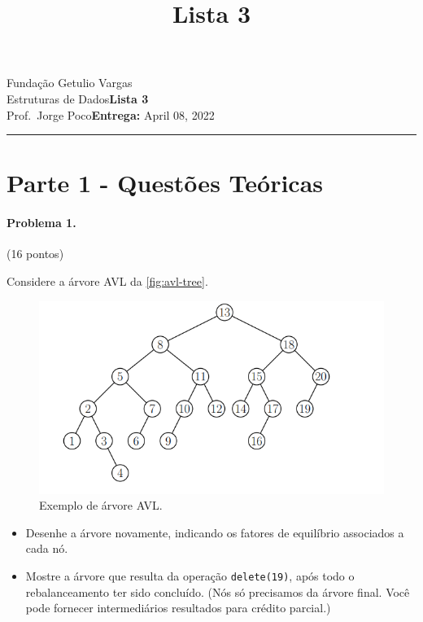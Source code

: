 \documentclass{article}
\title{Lista 3}
\date{}
\newcommand{\assignment}{Lista 3}
\newcommand{\duedate}{April 08, 2022}
\begin{document}
Fundação Getulio Vargas\hfill\\
Estruturas de Dados\hfill\textbf{\assignment}\\
Prof.\ Jorge Poco\hfill\textbf{Entrega:} \duedate\\
\smallskip\hrule\bigskip

{\let\newpage\relax\maketitle}
\maketitle

\section*{Parte 1 - Questões Teóricas}
\paragraph{Problema 1.} (16 pontos)

Considere a árvore AVL da \autoref{fig:avl-tree}.

\begin{figure}[h]
    \centering
    \includegraphics[width = 0.7\linewidth]{figures/fig-1.png}
    \caption{Exemplo de árvore AVL.}
    \label{fig:avl-tree}
\end{figure}

\begin{itemize}
    \item Desenhe a árvore novamente, indicando os fatores de equilíbrio associados a cada nó.
    \item Mostre a árvore que resulta da operação \texttt{delete(19)}, após todo o rebalanceamento ter sido concluído. (Nós só precisamos da árvore final. Você pode fornecer intermediários resultados para crédito parcial.) 
\end{itemize}
\end{document}
